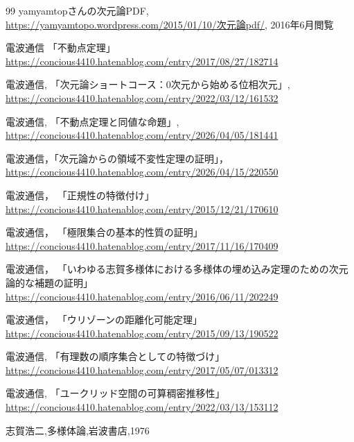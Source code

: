 \documentclass[leqno, a4paper, 12pt]{jsarticle}
\theoremstyle{plain}
\theoremstyle{definition}
\theoremstyle{remark}
\numberwithin{equation}{section}
\begin{document}
{}
\renewcommand{\refname}{和文資料}
\begin{thebibliography}{99}
yamyamtopさんの次元論PDF,
\url{https://yamyamtopo.wordpress.com/2015/01/10/次元論pdf/}, 
2016年6月閲覧


電波通信
「不動点定理」
\url{https://concious4410.hatenablog.com/entry/2017/08/27/182714}




電波通信, 「次元論ショートコース：0次元から始める位相次元」, 
\url{https://concious4410.hatenablog.com/entry/2022/03/12/161532}


電波通信, 「不動点定理と同値な命題」, 
\url{https://concious4410.hatenablog.com/entry/2026/04/05/181441}

電波通信，「次元論からの領域不変性定理の証明」，
\url{https://concious4410.hatenablog.com/entry/2026/04/15/220550}

電波通信，
「正規性の特徴付け」
\url{https://concious4410.hatenablog.com/entry/2015/12/21/170610}

電波通信，
「極限集合の基本的性質の証明」
\url{https://concious4410.hatenablog.com/entry/2017/11/16/170409}

電波通信，
「いわゆる志賀多様体における多様体の埋め込み定理のための次元論的な補題の証明」
\url{https://concious4410.hatenablog.com/entry/2016/06/11/202249}

電波通信，
「ウリゾーンの距離化可能定理」
\url{https://concious4410.hatenablog.com/entry/2015/09/13/190522}

電波通信, 
「有理数の順序集合としての特徴づけ」
\url{https://concious4410.hatenablog.com/entry/2017/05/07/013312}

電波通信, 
「ユークリッド空間の可算稠密推移性」
\url{https://concious4410.hatenablog.com/entry/2022/03/13/153112}

志賀浩二,多様体論,岩波書店,1976

\end{thebibliography}


\renewcommand{\refname}{参考文献}










			
\end{document}
